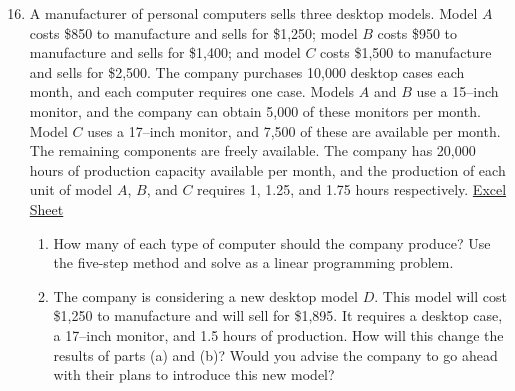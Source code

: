 \documentclass[12pt, oneside]{book}
\newenvironment{solution}{\textit{Solution.}}
\newcommand{\sol}[1]{
    \begin{customframedproof}[linecolor=orangehdx!75,]
        \begin{solution}
        #1
        \end{solution}
    \end{customframedproof}
}
\begin{document}
\begin{enumerate}
    \setcounter{enumi}{15}
    \item A manufacturer of personal computers sells three desktop models. Model \(A\) costs \$850 to manufacture and sells for \$1,250; model \(B\) costs \$950 to manufacture and sells for \$1,400; and model \(C\) costs \$1,500 to manufacture and sells for \$2,500. The company purchases 10,000 desktop cases each month, and each computer requires one case. Models \(A\) and \(B\) use a 15–inch monitor, and the company can obtain 5,000 of these monitors per month. Model \(C\) uses a 17–inch monitor, and 7,500 of these are available per month. The remaining components are freely available. The company has 20,000 hours of production capacity available per month, and the production of each unit of model \(A\), \(B\), and \(C\) requires 1, 1.25, and 1.75 hours respectively. \hyperref[ex:1]{Excel Sheet}
    \begin{enumerate}
        \item How many of each type of computer should the company produce? Use the five-step method and solve as a linear programming problem.


        \setcounter{enumii}{3}

        \item The company is considering a new desktop model \(D\). This model will cost \$1,250 to manufacture and will sell for \$1,895. It requires a desktop case, a 17–inch monitor, and 1.5 hours of production. How will this change the results of parts (a) and (b)? Would you advise the company to go ahead with their plans to introduce this new model?


\end{enumerate}
\end{enumerate}
\end{document}
